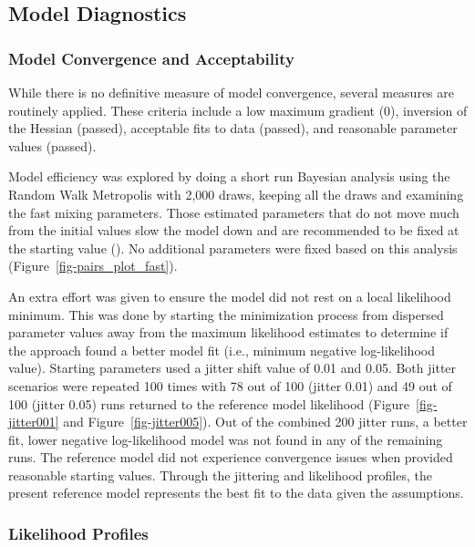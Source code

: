 \documentclass[
]{scrartcl}
\begin{document}
\newpage{}

\subsection{Model Diagnostics}\label{model-diagnostics}

\subsubsection{Model Convergence and
Acceptability}\label{model-convergence}

While there is no definitive measure of model convergence, several
measures are routinely applied. These criteria include a low maximum
gradient (0), inversion of the Hessian (passed), acceptable fits to data
(passed), and reasonable parameter values (passed).

Model efficiency was explored by doing a short run Bayesian analysis
using the Random Walk Metropolis with 2,000 draws, keeping all the draws
and examining the fast mixing parameters. Those estimated parameters
that do not move much from the initial values slow the model down and
are recommended to be fixed at the starting value
(). No
additional parameters were fixed based on this analysis
(Figure~\ref{fig-pairs_plot_fast}).

An extra effort was given to ensure the model did not rest on a local
likelihood minimum. This was done by starting the minimization process
from dispersed parameter values away from the maximum likelihood
estimates to determine if the approach found a better model fit (i.e.,
minimum negative log-likelihood value). Starting parameters used a
jitter shift value of 0.01 and 0.05. Both jitter scenarios were repeated
100 times with 78 out of 100 (jitter 0.01) and 49 out of 100 (jitter
0.05) runs returned to the reference model likelihood
(Figure~\ref{fig-jitter001} and Figure~\ref{fig-jitter005}). Out of the
combined 200 jitter runs, a better fit, lower negative log-likelihood
model was not found in any of the remaining runs. The reference model
did not experience convergence issues when provided reasonable starting
values. Through the jittering and likelihood profiles, the present
reference model represents the best fit to the data given the
assumptions.

\subsubsection{Likelihood Profiles}\label{likelihood-profiles}
\end{document}
